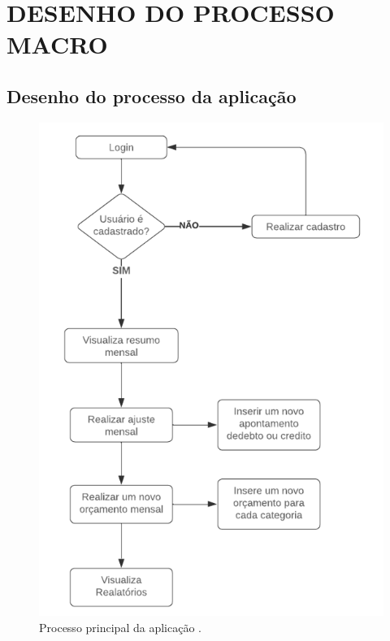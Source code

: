\chapter{DESENHO DO PROCESSO MACRO}\label{cap:macro}


\section{Desenho do processo da aplicação}



\begin{figure}[htb]
	\caption{\label{fig:mainProcess}Processo principal da aplicação .}
	\begin{center}
		\includegraphics[scale=0.5]{images/ProcessoAplicacao.png}
	\end{center}
\end{figure}






